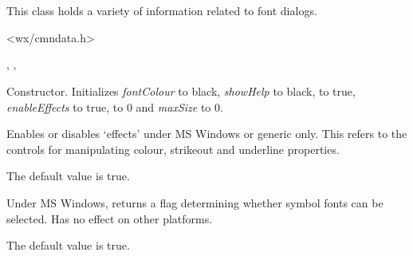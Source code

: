 \section{}\label{wxfontdata}


This class holds a variety of information related to font dialogs.




<wx/cmndata.h>




, , 


\label{wxfontdatactor}


Constructor. Initializes {\it fontColour} to black, {\it showHelp} to black,
 to true, {\it enableEffects} to true,
 to 0 and {\it maxSize} to 0.

\label{wxfontdataenableeffects}


Enables or disables `effects' under MS Windows or generic only. This refers to the
controls for manipulating colour, strikeout and underline properties.

The default value is true.

\label{wxfontdatagetallowsymbols}


Under MS Windows, returns a flag determining whether symbol fonts can be selected. Has no
effect on other platforms.

The default value is true.

\label{wxfontdatagetcolour}


